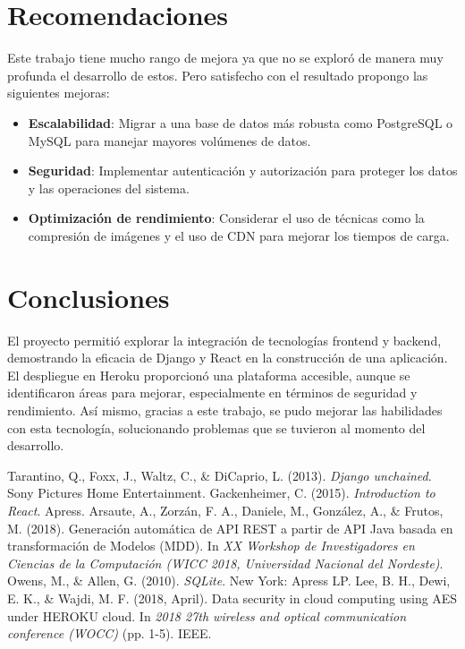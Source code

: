 \documentclass[conference]{IEEEtran}
\begin{document}
\section{Recomendaciones}
Este trabajo tiene mucho rango de mejora ya que no se exploró de manera muy profunda el desarrollo de estos. Pero satisfecho con el resultado propongo las siguientes mejoras:

\begin{itemize}
    \item \textbf{Escalabilidad}: Migrar a una base de datos más robusta como PostgreSQL o MySQL para manejar mayores volúmenes de datos.
    \item \textbf{Seguridad}: Implementar autenticación y autorización para proteger los datos y las operaciones del sistema.
    \item \textbf{Optimización de rendimiento}: Considerar el uso de técnicas como la compresión de imágenes y el uso de CDN para mejorar los tiempos de carga.
\end{itemize}

\section{Conclusiones}
El proyecto permitió explorar la integración de tecnologías frontend y backend, demostrando la eficacia de Django y React en la construcción de una aplicación. El despliegue en Heroku proporcionó una plataforma accesible, aunque se identificaron áreas para mejorar, especialmente en términos de seguridad y rendimiento. Así mismo, gracias a este trabajo, se pudo mejorar las habilidades con esta tecnología, solucionando problemas que se tuvieron al momento del desarrollo.

\begin{thebibliography}{9}
 Tarantino, Q., Foxx, J., Waltz, C., \& DiCaprio, L. (2013). \textit{Django unchained}. Sony Pictures Home Entertainment.
 Gackenheimer, C. (2015). \textit{Introduction to React}. Apress.
 Arsaute, A., Zorzán, F. A., Daniele, M., González, A., \& Frutos, M. (2018). Generación automática de API REST a partir de API Java basada en transformación de Modelos (MDD). In \textit{XX Workshop de Investigadores en Ciencias de la Computación (WICC 2018, Universidad Nacional del Nordeste)}.
 Owens, M., \& Allen, G. (2010). \textit{SQLite}. New York: Apress LP.
 Lee, B. H., Dewi, E. K., \& Wajdi, M. F. (2018, April). Data security in cloud computing using AES under HEROKU cloud. In \textit{2018 27th wireless and optical communication conference (WOCC)} (pp. 1-5). IEEE.
\end{thebibliography}
\end{document}
